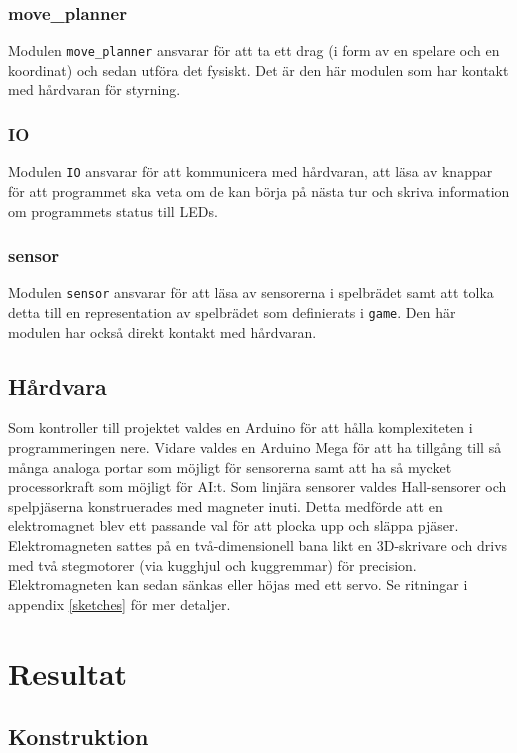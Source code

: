 \documentclass[a4paper]{article}
\begin{document}
\subsubsection*{move\_planner}
Modulen \texttt{move\_planner} ansvarar för att ta ett drag (i form av en spelare och en koordinat) och sedan utföra det fysiskt.
Det är den här modulen som har kontakt med hårdvaran för styrning.

\subsubsection*{IO}
Modulen \texttt{IO} ansvarar för att kommunicera med hårdvaran, att läsa av knappar för att programmet ska veta om de kan börja på nästa tur och skriva information om programmets status till LEDs.

\subsubsection*{sensor}
Modulen \texttt{sensor} ansvarar för att läsa av sensorerna i spelbrädet samt att tolka detta till en representation av spelbrädet som definierats i \texttt{game}.
Den här modulen har också direkt kontakt med hårdvaran.

\subsection{Hårdvara}
Som kontroller till projektet valdes en Arduino för att hålla komplexiteten i programmeringen nere.
Vidare valdes en Arduino Mega för att ha tillgång till så många analoga portar som möjligt för sensorerna samt att ha så mycket processorkraft som möjligt för AI:t.
Som linjära sensorer valdes Hall-sensorer och spelpjäserna konstruerades med magneter inuti.
Detta medförde att en elektromagnet blev ett passande val för att plocka upp och släppa pjäser.
Elektromagneten sattes på en två-dimensionell bana likt en 3D-skrivare och drivs med två stegmotorer (via kugghjul och kuggremmar) för precision.
Elektromagneten kan sedan sänkas eller höjas med ett servo.
Se ritningar i appendix \ref{sketches} för mer detaljer.

\section{Resultat}
\subsection{Konstruktion}
\end{document}
